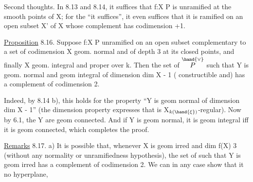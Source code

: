 

Second thoughts. In 8.13 and 8.14, it suffices  that f:X\hand{$\to$} P is unramified
at the smooth points of X; for the “it suffices”, it even suffices
that it is ramified on an open subset X' of X whose complement has
codimension \hand{$\geqslant$} +1.

\uline{Proposition} 8.16. Suppose f:X\hand{$\to$} P unramified on an open subset
complementary to a set of codimension  X geom. normal and
of depth\hand{$\geqslant$} 3 at its closed points, and finally X geom. integral and proper
over k. Then the set of \hand{$\xi \in$} $\overset{\hand{\vee}}{P}$ such that 
Y\hand{$_\xi$} is geom. normal and geom integral of dimension dim X - 1 (
constructible and) has a complement of codimension \hand{$\geqslant$} 2.

Indeed, by 8.14 b), this holds for the property
“Y\hand{$_\xi$} is geom normal of dimension dim X - 1” (the dimension
property expresses that \hand{$\phi_\xi$} is X$_{k(\hand{\xi})}$-regular). Now by 6.1,
\uline{} the Y\hand{$_\xi$} are geom connected. And if Y\hand{$_\xi$} is geom normal, it is
geom integral iff it is geom connected, which completes the proof.

\uline{Remarks} 8.17. a)  It is possible that, whenever X is geom irred
and dim f(X) \hand{$\geqslant$} 3 (without any normality or unramifiedness hypothesis),
the set of \hand{$\xi$} such that Y\hand{$_\xi$} is geom irred has a complement
of codimension \hand{$\geqslant$}2. We can in any case show that it  no
hyperplane, 


